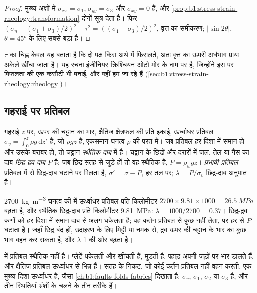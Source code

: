 \begin{proof}
मुख्य अक्षों में $\sigma_{xx} = \sigma_1$, $\sigma_{yy} = \sigma_3$ और $\sigma_{xy} = 0$ हैं, और \cref{prop:b1:stress-strain-rheology:transformation} दोनों सूत्र देता है। फिर $(\sigma_n - (\sigma_1+\sigma_3)/2)^2 + \tau^2 = ((\sigma_1-\sigma_3)/2)^2$, वृत्त का समीकरण; $|\sin2\theta|$, $\theta = \ang{45}$ के लिए सबसे बड़ा है।
\end{proof}

$\tau$ का चिह्न केवल यह बताता है कि दो पक्ष किस अर्थ में फिसलते, अतः वृत्त का ऊपरी अर्धभाग प्रायः अकेले खींचा जाता है। यह रचना इंजीनियर क्रिश्चियन ओटो मोर के नाम पर है, जिन्होंने इस पर विफलता की एक कसौटी भी बनाई, और वहीं हम जा रहे हैं (\cref{sec:b1:stress-strain-rheology:rheology})।

\subsection*{गहराई पर प्रतिबल}

\begin{definition}[स्थैतिक दाब, छिद्र-द्रव दाब, प्रभावी प्रतिबल]
\label{def:b1:stress-strain-rheology:lithostatic}
गहराई $z$ पर, ऊपर की चट्टान का भार, क्षैतिज क्षेत्रफल की प्रति इकाई, ऊर्ध्वाधर प्रतिबल $\sigma_v = \int_0^z\rho g\,\mathrm dz'$ है, जो $\rho g z$ है, एकसमान घनत्व $\rho$ की परत में। जब प्रतिबल हर दिशा में समान हो और उसके बराबर हो, तो चट्टान \emph{स्थैतिक दाब} में है। चट्टान के छिद्रों और दरारों में जल, तेल या गैस का दाब \emph{छिद्र-द्रव दाब} $P$ है; जब छिद्र सतह से जुड़े हों तो वह स्थैतिक है, $P = \rho_w g z$। \emph{प्रभावी प्रतिबल} प्रतिबल में से छिद्र-दाब घटाने पर मिलता है, $\sigma' = \sigma - P$, हर तल पर; $\lambda = P/\sigma_v$ छिद्र-दाब अनुपात है।
\end{definition}

\qty{2700}{kg.m^{-3}} घनत्व की  में ऊर्ध्वाधर प्रतिबल प्रति किलोमीटर $2700\times9.81\times1000 = \qty{26.5}{MPa}$ बढ़ता है, और स्थैतिक छिद्र-दाब प्रति किलोमीटर \qty{9.81}{MPa}: $\lambda = 1000/2700 = 0.37$।
छिद्र-द्रव कणों को हर दिशा में समान दाब से अलग धकेलता है; वह कर्तन-प्रतिबल से कुछ नहीं लेता, पर हर  से $P$ घटाता है। जहाँ छिद्र बंद हों, उदाहरण के लिए मिट्टी या नमक से, द्रव ऊपर की चट्टान के भार का कुछ भाग वहन कर सकता है, और $\lambda$ 1 की ओर बढ़ता है।

 में प्रतिबल स्थैतिक नहीं है। प्लेटें धकेलती और खींचती हैं,  मुड़ती है, पहाड़ अपनी जड़ों पर भार डालते हैं, और क्षैतिज प्रतिबल ऊर्ध्वाधर से भिन्न हैं। सतह के निकट, जो कोई कर्तन-प्रतिबल नहीं वहन करती, एक मुख्य दिशा ऊर्ध्वाधर है, जैसा \cref{ch:b1:faults-folds-fabrics} दिखाता है: $\sigma_v$, $\sigma_1$, $\sigma_2$ या $\sigma_3$ है, और तीन स्थितियाँ भ्रंशों के चलने के तीन तरीके हैं।


